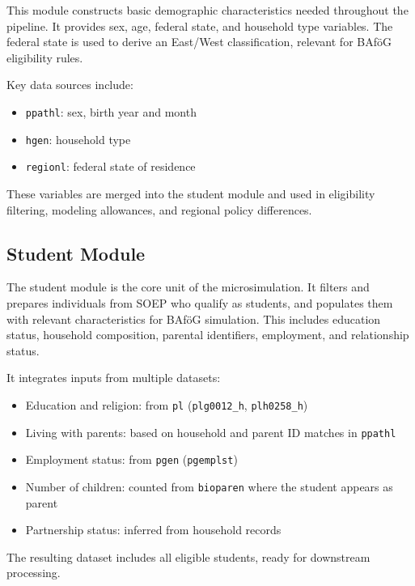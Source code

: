 This module constructs basic demographic characteristics needed throughout the pipeline. It provides sex, age, federal state, and household type variables. The federal state is used to derive an East/West classification, relevant for BAföG eligibility rules.

Key data sources include:

\begin{itemize}
  \item \texttt{ppathl}: sex, birth year and month
  \item \texttt{hgen}: household type
  \item \texttt{regionl}: federal state of residence
\end{itemize}

These variables are merged into the student module and used in eligibility filtering, modeling allowances, and regional policy differences.

\subsection{Student Module}

The student module is the core unit of the microsimulation. 
It filters and prepares individuals from SOEP who qualify as students, and populates them with relevant characteristics for BAföG simulation. 
This includes education status, household composition, parental identifiers, employment, and relationship status.

It integrates inputs from multiple datasets:

\begin{itemize}
  \item Education and religion: from \texttt{pl} (\texttt{plg0012\_h}, \texttt{plh0258\_h})
  \item Living with parents: based on household and parent ID matches in \texttt{ppathl}
  \item Employment status: from \texttt{pgen} (\texttt{pgemplst})
  \item Number of children: counted from \texttt{bioparen} where the student appears as parent
  \item Partnership status: inferred from household records
\end{itemize}

The resulting dataset includes all eligible students, ready for downstream processing.

